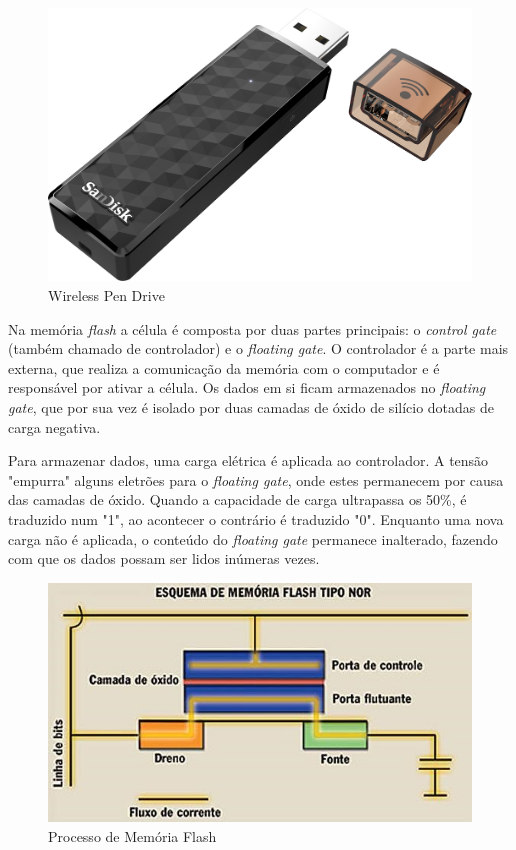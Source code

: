 \documentclass{report}
\begin{document}
	\begin{figure} [h]
		\centering
		\includegraphics[scale=0.2]{pen.jpg}
		\caption{Wireless Pen Drive}
	\end{figure}

\newpage
	Na memória \textit{flash} a célula é composta por duas partes principais: o \textit{control gate} (também chamado de controlador) e o \textit{floating gate}. O controlador é a parte mais externa, que realiza a comunicação da memória com o computador e é responsável por ativar a célula. Os dados em si ficam armazenados no \textit{floating gate}, que por sua vez é isolado por duas camadas de óxido de silício dotadas de carga negativa.
	
	Para armazenar dados, uma carga elétrica é aplicada ao controlador. A tensão "empurra" alguns eletrões para o \textit{floating gate}, onde estes permanecem por causa das camadas de óxido. Quando a capacidade de carga ultrapassa os 50\%, é traduzido num "1", ao acontecer o contrário é traduzido "0". Enquanto uma nova carga não é aplicada, o conteúdo do \textit{floating gate} permanece inalterado, fazendo com que os dados possam ser lidos inúmeras vezes.
\vspace{1mm}

	\begin{figure} [h]
		\centering
		\includegraphics[scale=0.4]{flash.jpg}
		\caption{Processo de Memória Flash}
	\end{figure}		 
		
\end{document}
